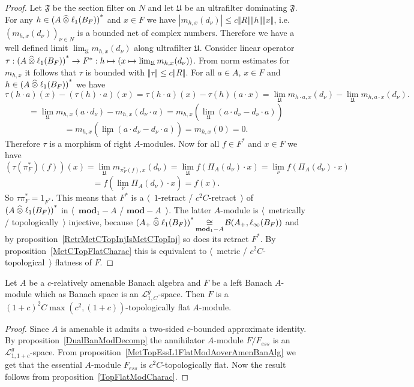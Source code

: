 \begin{proof}
Let $\mathfrak{F}$ be the section filter on $N$ and let $\mathfrak{U}$ be an
ultrafilter dominating $\mathfrak{F}$. For any 
$h\in {(A\mathbin{\widehat{\otimes}}\ell_1(B_F))}^*$ and $x\in F$ we 
have $|m_{h,x}(d_\nu)|\leq c\Vert R\Vert\Vert h\Vert\Vert x\Vert$, 
i.e. ${(m_{h,x}(d_\nu))}_{\nu\in N}$ is a
bounded net of complex numbers. Therefore we have a well defined limit
$\lim_{\mathfrak{U}}m_{h,x}(d_\nu)$ along ultrafilter $\mathfrak{U}$. Consider
linear operator 
$\tau
:{(A\mathbin{\widehat{\otimes}}\ell_1(B_F))}^*\to F^*
:h\mapsto(x\mapsto\lim_{\mathfrak{U}}m_{h,x}(d_\nu))$. From 
norm estimates for $m_{h,x}$ it follows that $\tau$ is bounded 
with $\Vert\tau\Vert\leq c\Vert R\Vert$. For all $a\in A$, $x\in F$ 
and $h\in {(A\mathbin{\widehat{\otimes}}\ell_1(B_F))}^*$ we have
$$
\tau(h\cdot a)(x)-(\tau(h)\cdot a)(x)
=\tau(h\cdot a)(x)-\tau(h)(a\cdot x)
=\lim_{\mathfrak{U}}m_{h\cdot a,x}(d_\nu)
-\lim_{\mathfrak{U}}m_{h,a\cdot x}(d_\nu).
$$
$$
=\lim_{\mathfrak{U}}m_{h,x}(a\cdot d_\nu)-m_{h,x}(d_\nu\cdot a)
=m_{h,x}\left(\lim_{\mathfrak{U}}(a\cdot d_\nu-d_\nu\cdot a)\right)
$$
$$
=m_{h,x}\left(\lim_{\nu}(a\cdot d_\nu-d_\nu\cdot a)\right)
=m_{h,x}(0)
=0.
$$
Therefore $\tau$ is a morphism of right $A$-modules. Now for all $f\in F^*$ and
$x\in F$ we have
$$
(\tau(\pi_F^*)(f))(x)
=\lim_{\mathfrak{U}}m_{\pi_F^*(f),x}(d_\nu)
=\lim_{\mathfrak{U}}f(\Pi_A(d_\nu)\cdot x)
=\lim_{\nu}f(\Pi_A(d_\nu)\cdot x)
$$
$$
=f\left(\lim_{\nu}\Pi_A(d_\nu)\cdot x\right)
=f(x).
$$
So $\tau\pi_F^*=1_{F^*}$. This means that $F^*$ is a $\langle$~$1$-retract /
 $c^2 C$-retract~$\rangle$ of ${(A\mathbin{\widehat{\otimes}}\ell_1(B_F))}^*$ in
 $\langle$~$\mathbf{mod}_1-A$ / $\mathbf{mod}-A$~$\rangle$. The latter
 $A$-module is $\langle$~metrically / topologically~$\rangle$ injective, because
 ${(A_+\mathbin{\widehat{\otimes}}\ell_1(B_F))}^*
 \mathop{\mathbin{\cong}}\limits_{\mathbf{mod}_1-A}
 \mathcal{B}(A_+,\ell_\infty(B_F))$
 and by proposition~\ref{RetrMetCTopInjIsMetCTopInj} so does its 
 retract $F^*$. By proposition~\ref{MetCTopFlatCharac} this is equivalent 
 to $\langle$~metric / $c^2 C$-topological~$\rangle$ flatness of $F$.
\end{proof}

\begin{theorem}\label{TopL1FlatModAoverAmenBanAlg} Let $A$ be a $c$-relatively
amenable Banach algebra and $F$ be a left Banach $A$-module which as Banach
space is an $\mathscr{L}_{1, C}^g$-space. Then $F$ is a
${(1+c)}^2C\max(c^2,(1+c))$-topologically flat $A$-module.
\end{theorem}
\begin{proof} Since $A$ is amenable it admits a two-sided $c$-bounded
approximate identity. By proposition~\ref{DualBanModDecomp} the annihilator
$A$-module $F/F_{ess}$ is an $\mathscr{L}_{1,1+c}^g$-space. From
proposition~\ref{MetTopEssL1FlatModAoverAmenBanAlg} we get that the essential
$A$-module $F_{ess}$ is $c^2 C$-topologically flat. Now the result follows from
proposition~\ref{TopFlatModCharac}.
\end{proof}

